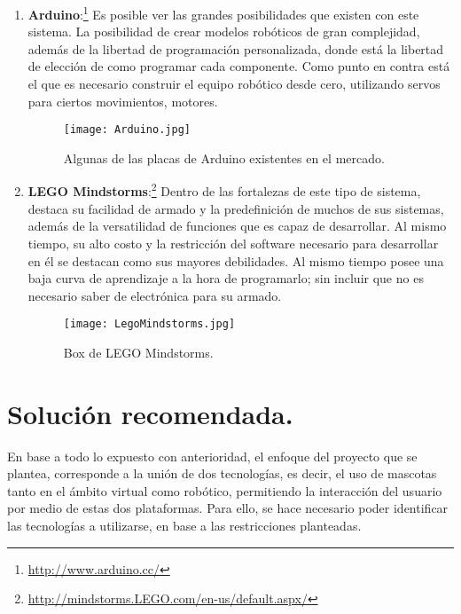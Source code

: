 \begin{enumerate}
  \begin{enumerate}
  \item {\bf Arduino}:\footnote{\url{http://www.arduino.cc/}} Es posible ver las grandes posibilidades que existen con este sistema. La posibilidad de crear modelos rob\'oticos de gran complejidad, adem\'as de la libertad de programaci\'on personalizada, donde est\'a la libertad de elecci\'on de como programar cada componente. Como punto en contra est\'a el que es necesario construir el equipo rob\'otico desde cero, utilizando servos para ciertos movimientos, motores.
\begin{figure}[H]
  \centering
  \texttt{[image: Arduino.jpg]}
  \caption{Algunas de las placas de Arduino existentes en el mercado.}
  \label{fig:LegoMindstorms}
\end{figure}

  \item {\bf LEGO Mindstorms}:\footnote{\url{http://mindstorms.LEGO.com/en-us/default.aspx/}} Dentro de las fortalezas de este tipo de sistema, destaca su facilidad de armado y la predefinici\'on de muchos de sus sistemas, adem\'as de la versatilidad de funciones que es capaz de desarrollar. Al mismo tiempo, su alto costo y la restricci\'on del software necesario para desarrollar en \'el se destacan como sus mayores debilidades. Al mismo tiempo posee una baja curva de aprendizaje a la hora de programarlo; sin incluir que no es necesario saber de electr\'onica para su armado.
\begin{figure}[H]
  \centering
  \texttt{[image: LegoMindstorms.jpg]}
  \caption{Box de LEGO Mindstorms.}
  \label{fig:LegoMindstorms}
\end{figure}

  \end{enumerate}
\end{enumerate}

\newpage
\section{Soluci\'on recomendada.}

En base a todo lo expuesto con anterioridad, el enfoque del proyecto que se plantea, corresponde a la uni\'on de dos tecnolog\'ias, es decir, el uso de mascotas tanto en el \'ambito virtual como rob\'otico, permitiendo la interacci\'on del usuario por medio de estas dos plataformas. Para ello, se hace necesario poder identificar las tecnolog\'ias a utilizarse, en base a las restricciones planteadas.

